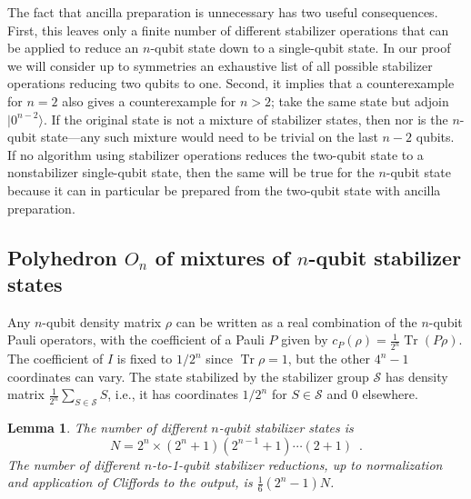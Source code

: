\documentclass[11pt]{article}
\def\ket #1{\vert #1\rangle}
\DeclareMathOperator{\tr}{Tr}%
\newcommand{\beq}{\begin{equation}}
\newcommand{\eeq}{\end{equation}}
\newtheorem{lemma}{Lemma}
\theoremstyle{note}
\begin{document}
The fact that ancilla preparation is unnecessary has two useful consequences.  First, this leaves only a finite number of different stabilizer operations that can be applied to reduce an $n$-qubit state down to a single-qubit state.  In our proof we will consider up to symmetries an exhaustive list of all possible stabilizer operations reducing two qubits to one.  Second, it implies that a counterexample for $n=2$ also gives a counterexample for $n>2$; take the same state but adjoin $\ket{0^{n-2}}$.  If the original state is not a mixture of stabilizer states, then nor is the $n$-qubit state---any such mixture would need to be trivial on the last $n-2$ qubits.  If no algorithm using stabilizer operations reduces the two-qubit state to a nonstabilizer single-qubit state, then the same will be true for the $n$-qubit state because it can in particular be prepared from the two-qubit state with ancilla preparation.


\subsection{Polyhedron $O_n$ of mixtures of $n$-qubit stabilizer states} \label{s:twoqubitstatepolyhedron}

Any $n$-qubit density matrix $\rho$ can be written as a real combination of the $n$-qubit Pauli operators, with the coefficient of a Pauli $P$ given by $c_P(\rho) = \tfrac{1}{2^n} \tr (P \rho)$.  The coefficient of $I$ is fixed to $1/2^n$ since $\tr \rho = 1$, but the other $4^n-1$ coordinates can vary.  The state stabilized by the stabilizer group $\mathcal{S}$ has density matrix $\tfrac{1}{2^n} \sum_{S \in \mathcal{S}} S$, i.e., it has coordinates $1/2^n$ for $S \in \mathcal{S}$ and 0 elsewhere.  

\begin{lemma} \label{t:countinglemma}
The number of different $n$-qubit stabilizer states is
\beq
N = 2^n \times (2^n+1)(2^{n-1}+1)\cdots(2+1)
 \enspace .
\eeq
The number of different $n$-to-1-qubit stabilizer reductions, up to normalization and application of Cliffords to the output, is $\tfrac{1}{6}(2^n-1)N$.
\end{lemma}
\end{document}
